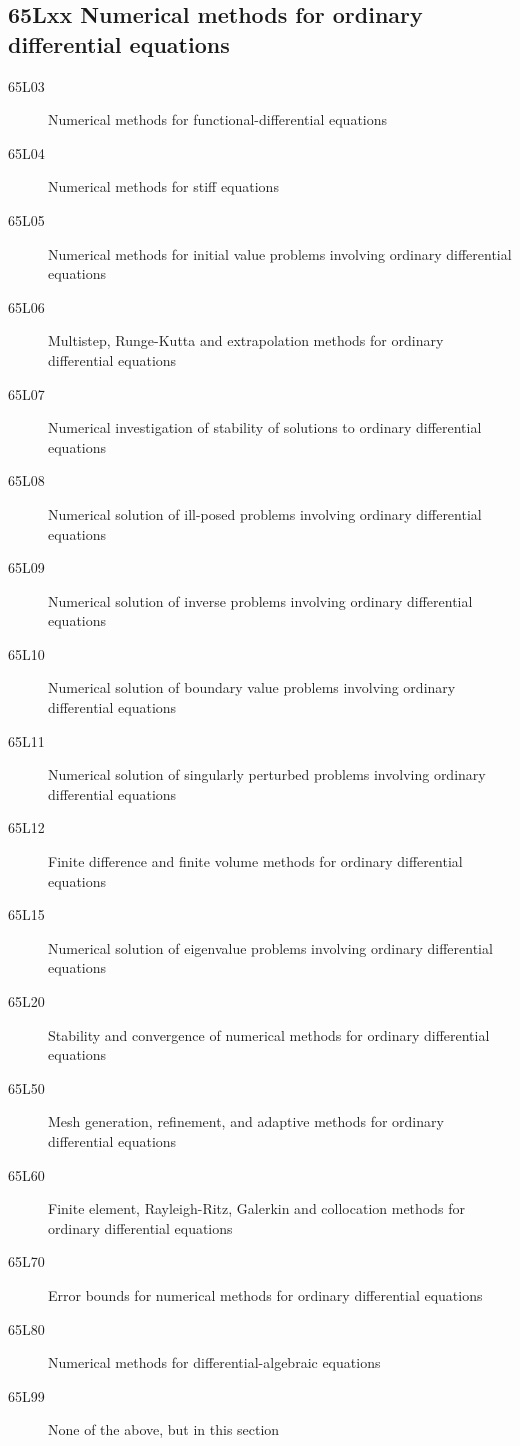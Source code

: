 \documentclass[letterpaper]{article}
\begin{document}
\subsection*{65Lxx Numerical methods for ordinary differential equations }\label{65Lxx}
\begin{description}  
\item [65L03]\label{65L03} Numerical methods for functional-differential equations
\item [65L04]\label{65L04} Numerical methods for stiff equations
\item [65L05]\label{65L05} Numerical methods for initial value problems involving ordinary differential equations
\item [65L06]\label{65L06} Multistep, Runge-Kutta and extrapolation methods for ordinary differential equations
\item [65L07]\label{65L07} Numerical investigation of stability of solutions to ordinary differential equations
\item [65L08]\label{65L08} Numerical solution of ill-posed problems involving ordinary differential equations
\item [65L09]\label{65L09} Numerical solution of inverse problems involving ordinary differential equations
\item [65L10]\label{65L10} Numerical solution of boundary value problems involving ordinary differential equations
\item [65L11]\label{65L11} Numerical solution of singularly perturbed problems involving ordinary differential equations
\item [65L12]\label{65L12} Finite difference and finite volume methods for ordinary differential equations
\item [65L15]\label{65L15} Numerical solution of eigenvalue problems involving ordinary differential equations
\item [65L20]\label{65L20} Stability and convergence of numerical methods for ordinary differential equations
\item [65L50]\label{65L50} Mesh generation, refinement, and adaptive methods for ordinary differential equations
\item [65L60]\label{65L60} Finite element, Rayleigh-Ritz, Galerkin and collocation methods for ordinary differential equations
\item [65L70]\label{65L70} Error bounds for numerical methods for ordinary differential equations
\item [65L80]\label{65L80} Numerical methods for differential-algebraic equations
\item [65L99]\label{65L99} None of the above, but in this section
\end{description}
\end{document}
